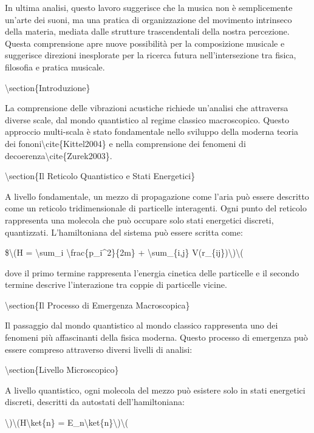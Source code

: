\documentclass[a4paper,11pt]{article}
\begin{document}
In ultima analisi, questo lavoro suggerisce che la musica non \`e
semplicemente un'arte dei suoni, ma una pratica di organizzazione del
movimento intrinseco della materia, mediata dalle strutture
trascendentali della nostra percezione. Questa comprensione apre nuove
possibilit\`a per la composizione musicale e suggerisce direzioni
inesplorate per la ricerca futura nell'intersezione tra fisica,
filosofia e pratica musicale.


\textbackslash{}section\{Introduzione\}

La comprensione delle vibrazioni acustiche richiede un'analisi che
attraversa diverse scale, dal mondo quantistico al regime classico
macroscopico. Questo approccio multi-scala \`e stato fondamentale nello
sviluppo della moderna teoria dei fononi\textbackslash{}cite\{Kittel2004\} e nella
comprensione dei fenomeni di decoerenza\textbackslash{}cite\{Zurek2003\}.

\textbackslash{}section\{Il Reticolo Quantistico e Stati Energetici\}

A livello fondamentale, un mezzo di propagazione come l'aria pu\`o essere
descritto come un reticolo tridimensionale di particelle interagenti.
Ogni punto del reticolo rappresenta una molecola che pu\`o occupare solo
stati energetici discreti, quantizzati. L'hamiltoniana del sistema pu\`o
essere scritta come:

\$\textbackslash{}(H = \textbackslash{}sum\_i \textbackslash{}frac\{p\_i\textasciicircum{}2\}\{2m\} + \textbackslash{}sum\_\{i,j\} V(r\_\{ij\})\textbackslash{})\textbackslash{}(

dove il primo termine rappresenta l'energia cinetica delle particelle e
il secondo termine descrive l'interazione tra coppie di particelle
vicine.

\textbackslash{}section\{Il Processo di Emergenza Macroscopica\}

Il passaggio dal mondo quantistico al mondo classico rappresenta uno dei
fenomeni pi\`u affascinanti della fisica moderna. Questo processo di
emergenza pu\`o essere compreso attraverso diversi livelli di analisi:

\textbackslash{}section\{Livello Microscopico\}

A livello quantistico, ogni molecola del mezzo pu\`o esistere solo in
stati energetici discreti, descritti da autostati dell'hamiltoniana:

\textbackslash{})\textbackslash{}(H\textbackslash{}ket\{n\} = E\_n\textbackslash{}ket\{n\}\textbackslash{})\textbackslash{}(
\end{document}
